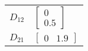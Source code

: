 \begin{tabular}{cl}
 $D_{12}$ & $\left[\begin{matrix}0\\0.5\end{matrix}\right]$                                                                                                                                                                                                                                                                                                                                                                                                                                                                                                                   \\
 $D_{21}$ & $\left[\begin{matrix}0 & 1.9\end{matrix}\right]$                                                                                                                                                                                                                                                                                                                                                                                                                                                                                                                  \\
\hline
\end{tabular}